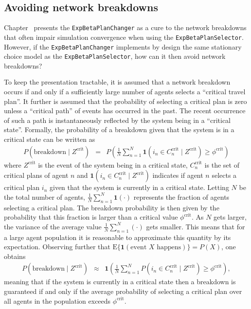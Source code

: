 

\subsection{Avoiding network breakdowns}


Chapter~ presents the \texttt{ExpBetaPlanChanger}
as a cure to the network breakdowns that often impair simulation convergence
when using the \texttt{ExpBetaPlanSelector}. However, if the \texttt{ExpBetaPlanChanger}
implements by design the same stationary choice model as the \texttt{ExpBetaPlanSelector},
 how can it then avoid network breakdowns?

To keep the presentation tractable, it is assumed that a network breakdown
occurs if and only if a sufficiently large number of agents selects
a {}``critical travel plan''. It further is assumed that the probability
of selecting a critical plan is zero unless a {}``critical path''
of events has occurred in the past. The recent occurrence of such
a path is instantaneously reflected by the system being in a {}``critical
state''. Formally, the probability of a breakdown given that the
system is in a critical state can be written as
\begin{eqnarray}
P(\text{breakdown}\mid Z^{\text{crit}}) & = & P\left(\frac{1}{N}\sum_{n=1}^{N}\mathbf{1}(i_{n}\in C_{n}^{\text{crit}}\mid Z^{\text{crit}})\geq\phi^{\text{crit}}\right)
\end{eqnarray}
where $Z^{\text{crit}}$ is the event of the system being in a critical
state, $C_{n}^{\text{crit}}$ is the set of critical plans of agent
$n$ and $\mathbf{1}(i_{n}\in C_{n}^{\text{crit}}\mid Z^{\text{crit}})$
indicates if agent $n$ selects a critical plan $i_{n}$ given that
the system is currently in a critical state. Letting $N$ be the total
number of agents, $\frac{1}{N}\sum_{n=1}^{N}\mathbf{1}(\cdot)$ represents
the fraction of agents selecting a critical plan. The breakdown probability
is then given by the probability that this fraction is larger than
a critical value $\phi^{\text{crit}}$. As $N$ gets larger, the variance
of the average value $\frac{1}{N}\sum_{n=1}^{N}(\cdot)$ gets smaller.
This means that for a large agent population it is reasonable to approximate
this quantity by its expectation. Observing further that $\text{E}\{\mathbf{1}(\text{event }X\text{ happens})\}=P(X)$,
one obtains
\begin{eqnarray}
P(\text{breakdown}\mid Z^{\text{crit}}) & \approx & \mathbf{1}\left(\frac{1}{N}\sum_{n=1}^{N}P(i_{n}\in C_{n}^{\text{crit}}\mid Z^{\text{crit}})\geq\phi^{\text{crit}}\right),\label{eq:breakdown-indicator}
\end{eqnarray}
meaning that if the system is currently in a critical state then a
breakdown is guaranteed if and only if the average probability of
selecting a critical plan over all agents in the population exceeds
$\phi^{\text{crit}}$.

